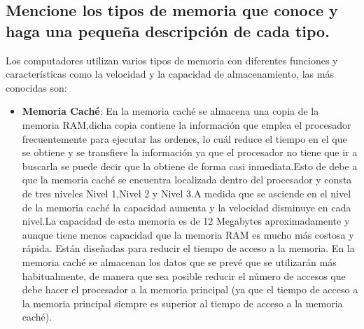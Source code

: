 \documentclass{article}
\begin{document}
\subsection{Mencione los tipos de memoria que conoce y haga una pequeña descripción de cada tipo.}
Los computadores utilizan varios tipos de memoria con diferentes funciones y características como la velocidad y la capacidad de almacenamiento, las más conocidas son:
\begin{itemize}
\item \textbf{Memoria Caché}:
    En la memoria caché se almacena una copia de la memoria RAM,dicha copia contiene la información que  emplea el procesador frecuentemente para ejecutar las ordenes, lo cuál reduce el tiempo en el que se obtiene y se transfiere la información ya que el procesador no tiene que ir a buscarla se puede decir que la obtiene de forma casi inmediata.Esto de debe a que la memoria caché se encuentra localizada dentro del procesador y consta de tres niveles Nivel 1,Nivel 2 y Nivel 3.A medida que se asciende en el nivel de la memoria caché la capacidad aumenta y la velocidad disminuye en cada nivel.La capacidad de esta memoria  es de 12 Megabytes aproximadamente y aunque tiene menos capacidad que la memoria RAM es mucho más costosa y rápida\cite{ref}.\newline
    Están diseñadas para reducir el tiempo de acceso a la memoria. En la memoria caché se almacenan los datos que se prevé que se utilizarán más habitualmente, de manera que sea posible reducir el número de accesos que debe hacer el procesador a la memoria principal (ya que el tiempo de acceso a la memoria principal siempre es superior al tiempo de acceso a la memoria caché)\cite{Orenga}.


\end{itemize}
\end{document}

